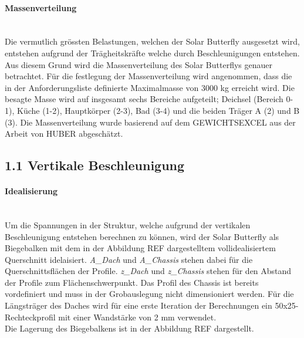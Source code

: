 \paragraph{Massenverteilung}\mbox{}\\
Die vermutlich grössten Belastungen, welchen der Solar Butterfly ausgesetzt wird, entstehen aufgrund der Trägheitskräfte welche durch Beschleunigungen entstehen. Aus diesem Grund wird die Massenverteilung des Solar Butterflys genauer betrachtet. Für die festlegung der Massenverteilung wird angenommen, dass die in der Anforderungsliste definierte Maximalmasse von 3000 kg erreicht wird. Die besagte Masse wird auf insgesamt sechs Bereiche aufgeteilt; Deichsel (Bereich 0-1), Küche (1-2), Hauptkörper (2-3), Bad (3-4) und die beiden Träger A (2) und B (3).
Die Massenverteilung wurde basierend auf dem GEWICHTSEXCEL aus der Arbeit von HUBER abgeschätzt.

\subsection{1.1 Vertikale Beschleunigung}
\label{1.1 Vertikale Beschleunigung}
  \paragraph{Idealisierung}\mbox{}\\
  Um die Spannungen in der Struktur, welche aufgrund der vertikalen Beschleunigung entstehen berechnen zu können, wird der Solar Butterfly als Biegebalken mit dem in der Abbildung REF dargestelltem vollidealisiertem Querschnitt idelaisiert. \emph{A\_Dach} und \emph{A\_Chassis} stehen dabei für die Querschnittsflächen der Profile. \emph{z\_Dach} und \emph{z\_Chassis} stehen für den Abstand der Profile zum Flächenschwerpunkt. Das Profil des Chassis ist bereits vordefiniert und muss in der Grobauslegung nicht dimensioniert werden. Für die Längsträger des Daches wird für eine erste Iteration der Berechnungen ein 50x25-Rechteckprofil mit einer Wandstärke von 2 mm verwendet.\\
  Die Lagerung des Biegebalkens ist in der Abbildung REF dargestellt.


